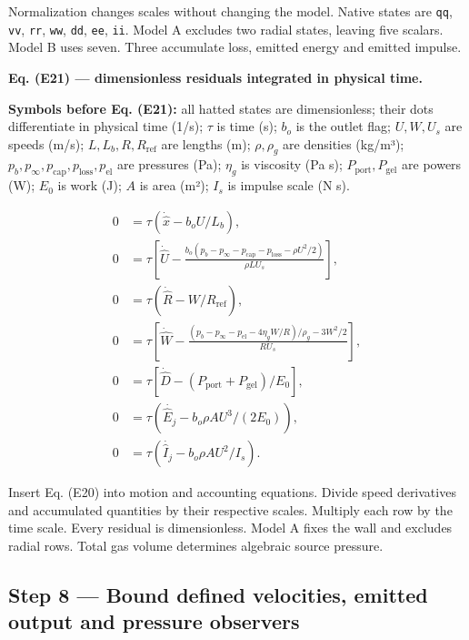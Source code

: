 \documentclass[11pt]{article}
\begin{document}
Normalization changes scales without changing the model. Native states are \texttt{qq}, \texttt{vv}, \texttt{rr}, \texttt{ww}, \texttt{dd}, \texttt{ee}, \texttt{ii}. Model A excludes two radial states, leaving five scalars. Model B uses seven. Three accumulate loss, emitted energy and emitted impulse.


\textbf{Eq. (E21) — dimensionless residuals integrated in physical time.}


\textbf{Symbols before Eq. (E21):} all hatted states are dimensionless; their dots differentiate in physical time (1/s); \(\tau\) is time (s); \(b_o\) is the outlet flag; \(U,W,U_s\) are speeds (m/s); \(L,L_b,R,R_{\mathrm{ref}}\) are lengths (m); \(\rho,\rho_g\) are densities (kg/m³); \(p_b,p_\infty,p_{\mathrm{cap}},p_{\mathrm{loss}},p_{\mathrm{el}}\) are pressures (Pa); \(\eta_g\) is viscosity (Pa s); \(P_{\mathrm{port}},P_{\mathrm{gel}}\) are powers (W); \(E_0\) is work (J); \(A\) is area (m²); \(I_s\) is impulse scale (N s).



\begin{equation*}
\begin{aligned}
0&=\tau(\dot{\widehat x}-b_oU/L_b),\\
0&=\tau\left[\dot{\widehat U}-\frac{b_o(p_b-p_\infty-p_{\mathrm{cap}}-p_{\mathrm{loss}}-\rho U^2/2)}{\rho LU_s}\right],\\
0&=\tau(\dot{\widehat R}-W/R_{\mathrm{ref}}),\\
0&=\tau\left[\dot{\widehat W}-\frac{(p_b-p_\infty-p_{\mathrm{el}}-4\eta_gW/R)/\rho_g-3W^2/2}{RU_s}\right],\\
0&=\tau[\dot{\widehat D}-(P_{\mathrm{port}}+P_{\mathrm{gel}})/E_0],\\
0&=\tau(\dot{\widehat E_j}-b_o\rho AU^3/(2E_0)),\\
0&=\tau(\dot{\widehat I_j}-b_o\rho AU^2/I_s).
\end{aligned}
\end{equation*}

Insert Eq. (E20) into motion and accounting equations. Divide speed derivatives and accumulated quantities by their respective scales. Multiply each row by the time scale. Every residual is dimensionless. Model A fixes the wall and excludes radial rows. Total gas volume determines algebraic source pressure.



\subsection*{Step 8 — Bound defined velocities, emitted output and pressure observers}
\end{document}
